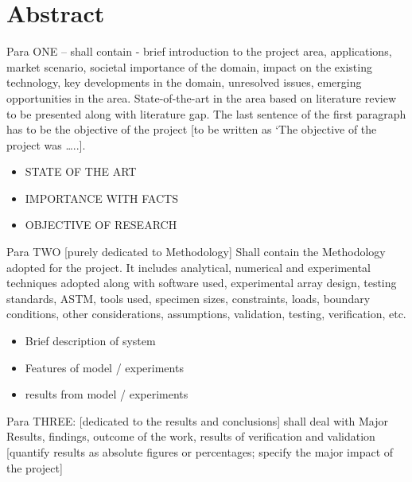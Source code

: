
\chapter*{Abstract} \label{cha:abstract}

Para ONE – shall contain - brief introduction to the project area, applications, market scenario, societal importance of the domain, impact on the existing technology, key developments in the domain, unresolved issues, emerging opportunities in the area. State-of-the-art in the area based on literature review to be presented along with literature gap. The last sentence of the first paragraph has to be the objective of the project [to be written as ‘The objective of the project was …..].

\begin{itemize}
\item STATE OF THE ART
\item IMPORTANCE WITH FACTS
\item OBJECTIVE OF RESEARCH
\end{itemize}

\vspace*{2em}

Para TWO [purely dedicated to Methodology] 
Shall contain the Methodology adopted for the project.  It includes analytical, numerical and experimental techniques adopted along with software used, experimental array design, testing standards, ASTM, tools used, specimen sizes, constraints, loads, boundary conditions, other considerations, assumptions, validation, testing, verification, etc.

\begin{itemize}
\item Brief description of system
\item Features of model / experiments
\item results from model / experiments
\end{itemize}



\vspace{2em}
Para THREE: [dedicated to the results and conclusions] shall deal with Major Results, findings, outcome of the work, results of  verification and validation [quantify results as absolute figures or percentages; specify the major impact of the project]